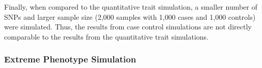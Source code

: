 		Finally, when compared to the quantitative trait simulation, a smaller number of \glspl{SNP} and larger sample size (2,000 samples with 1,000 cases and 1,000 controls) were simulated. 
		Thus, the results from case control simulations are not directly comparable to the results from the quantitative trait simulations.
		
		\subsubsection{Extreme Phenotype Simulation}
			\begin{figure}
				\centering
\end{figure}
